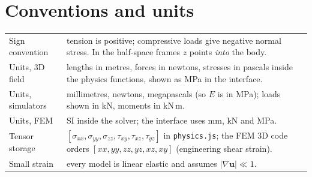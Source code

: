 \section{Conventions and units}
\begin{center}\small
\begin{tabular}{@{}p{3.2cm}p{11.8cm}@{}}\toprule
Sign convention & tension is positive; compressive loads give negative normal stress. In the half-space frames $z$ points \emph{into} the body.\\
Units, 3D field & lengths in metres, forces in newtons, stresses in pascals inside the physics functions, shown as MPa in the interface.\\
Units, simulators & millimetres, newtons, megapascals (so $E$ is in MPa); loads shown in kN, moments in kN\,m.\\
Units, FEM & SI inside the solver; the interface uses mm, kN and MPa.\\
Tensor storage & $[\sigma_{xx},\sigma_{yy},\sigma_{zz},\tau_{xy},\tau_{xz},\tau_{yz}]$ in \texttt{physics.js}; the FEM 3D code orders $[xx,yy,zz,yz,xz,xy]$ (engineering shear strain).\\
Small strain & every model is linear elastic and assumes $|\nabla\mathbf u|\ll1$.\\\bottomrule
\end{tabular}
\end{center}

